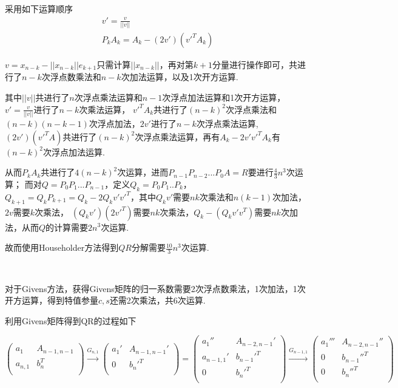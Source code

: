 \documentclass[UTF8]{ctexart}
\begin{document}
采用如下运算顺序
\begin{equation}\label{1-a-4}
    \begin{aligned}
        v'=\frac{v}{||v||}\\
        P_kA_k=A_k-(2v')(v'^TA_k)
    \end{aligned}
\end{equation}

$v=x_{n-k}-||x_{n-k}||e_{k+1}$只需计算$||x_{n-k}||$，再对第$k+1$分量进行操作即可，共进行了$n-k$次浮点数乘法和$n-k$次加法运算，以及1次开方运算.

其中$||v||$共进行了$n$次浮点乘法运算和$n-1$次浮点加法运算和1次开方运算，$v'=\frac{v}{||v||}$进行了$n-k$次乘法运算，
$v'^TA_k$共进行了$(n-k)^2$次浮点乘法和$(n-k)(n-k-1)$次浮点加法，$2v'$进行了$n-k$次浮点乘法运算,
$(2v')(v'^TA)$共进行了$(n-k)^2$次浮点乘法运算，再有$A_k-2v'v'^TA_k$有$(n-k)^2$次浮点加法运算.

从而$P_kA_k$共进行了$4(n-k)^2$次运算，进而$P_{n-1}P_{n-2}...P_0A=R$要进行$\frac{4}{3}n^3$次运算；
而对$Q=P_0P_1...P_{n-1}$，定义$Q_k=P_0P_1..P_k$，$Q_{k+1}=Q_kP_{k+1}=Q_k-2Q_kv'v'^T$，其中$Q_kv'$需要$nk$次乘法和$n(k-1)$次加法，$2v$需要$k$次乘法，
$(Q_kv')(2v'^T)$需要$nk$次乘法，$Q_k-(Q_kv'v^T)$需要$nk$次加法，从而$Q$的计算需要$2n^3$次运算.

故而使用Householder方法得到$QR$分解需要$\frac{10}{3}n^3$次运算.

~\

对于Givens方法，获得Givens矩阵的归一系数需要2次浮点数乘法，1次加法，1次开方运算，得到特值参量$c,s$还需2次乘法，共6次运算.

利用Givens矩阵得到QR的过程如下

\begin{equation}\label{1-a-5}
    \left(
        \begin{array}{cc}
            a_1 & A_{n-1,n-1}\\
            a_{n,1} & b_n^T \\
        \end{array}
    \right)
    \stackrel{G_{n,1}}{\longrightarrow}
    \left(
        \begin{array}{cc}
            a_1' & A_{n-1,n-1}'\\
            0 & b_n'^T \\
        \end{array}
    \right)
    =
    \left(
        \begin{array}{cc}
            a_1'' & A_{n-2,n-1}'\\
            a_{n-1,1}' & b_{n-1}'^T\\
            0 & b_n'^T \\
        \end{array}
    \right)
    \stackrel{G_{n-1,1}}{\longrightarrow}
    \left(
        \begin{array}{cc}
            a_1''' & A_{n-2,n-1}''\\
            0 & b_{n-1}''^T\\
            0 & b_n''^T \\
        \end{array}
    \right)
\end{equation}
\end{document}
